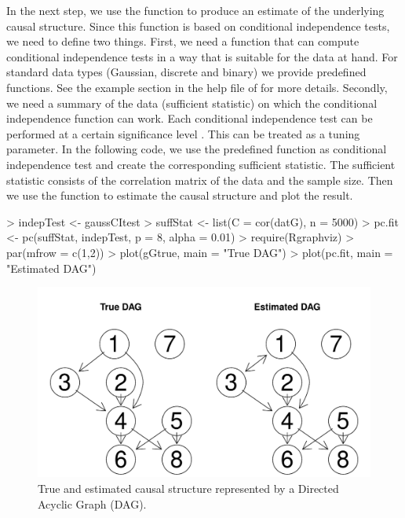 \documentclass[article]{jss}
\begin{document}
In the next step, we use the function  to produce an estimate
of the underlying causal structure. Since this function is based on
conditional independence tests, we need to define two things. First,
we need a function that can compute conditional independence tests in
a way that is suitable for the data at hand. For standard data types
(Gaussian, discrete and binary) we provide predefined functions. See
the example section in the help file of  for more
details. Secondly, we need a summary of the data (sufficient
statistic) on which the conditional independence function can
work. Each conditional independence test can be performed at a certain
significance level . This can be treated as a tuning
parameter. In the following code, we use the predefined function
 as conditional independence test and create the
corresponding sufficient statistic. The sufficient statistic consists
of the correlation matrix of the data and the sample size. Then we use
the function  to estimate the causal structure and plot the
result.

\begin{Schunk}
\begin{Sinput}
> indepTest <- gaussCItest 
> suffStat <- list(C = cor(datG), n = 5000)
> pc.fit <- pc(suffStat, indepTest, p = 8, alpha = 0.01)
> require(Rgraphviz)
> par(mfrow = c(1,2))
> plot(gGtrue, main = "True DAG")
> plot(pc.fit, main = "Estimated DAG")
\end{Sinput}
\end{Schunk}

\begin{figure}
  \begin{center}
\includegraphics{pcalgDoc-exIntroPlot}
\caption{True and estimated causal structure represented by a Directed
  Acyclic Graph (DAG).}
\label{fig:intro1}
\end{center}
\end{figure}
\end{document}
